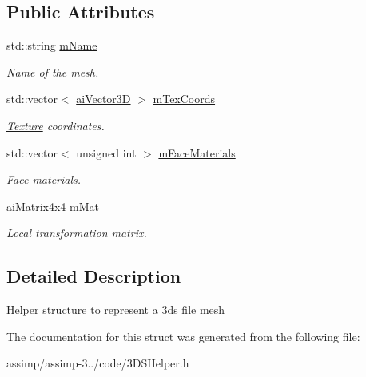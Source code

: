 \subsection*{Public Attributes}
\begin{DoxyCompactItemize}
\item 
\hypertarget{struct_assimp_1_1_d3_d_s_1_1_mesh_ae7afc8aec6109034179b696a19a62d49}{std\+::string \hyperlink{struct_assimp_1_1_d3_d_s_1_1_mesh_ae7afc8aec6109034179b696a19a62d49}{m\+Name}}\label{struct_assimp_1_1_d3_d_s_1_1_mesh_ae7afc8aec6109034179b696a19a62d49}

\begin{DoxyCompactList}\small\item\em Name of the mesh. \end{DoxyCompactList}\item 
\hypertarget{struct_assimp_1_1_d3_d_s_1_1_mesh_a41f938abc5be907009a83ef77651289e}{std\+::vector$<$ \hyperlink{structai_vector3_d}{ai\+Vector3\+D} $>$ \hyperlink{struct_assimp_1_1_d3_d_s_1_1_mesh_a41f938abc5be907009a83ef77651289e}{m\+Tex\+Coords}}\label{struct_assimp_1_1_d3_d_s_1_1_mesh_a41f938abc5be907009a83ef77651289e}

\begin{DoxyCompactList}\small\item\em \hyperlink{struct_assimp_1_1_d3_d_s_1_1_texture}{Texture} coordinates. \end{DoxyCompactList}\item 
\hypertarget{struct_assimp_1_1_d3_d_s_1_1_mesh_a99b188d70c456989949ffba3a95c9a1c}{std\+::vector$<$ unsigned int $>$ \hyperlink{struct_assimp_1_1_d3_d_s_1_1_mesh_a99b188d70c456989949ffba3a95c9a1c}{m\+Face\+Materials}}\label{struct_assimp_1_1_d3_d_s_1_1_mesh_a99b188d70c456989949ffba3a95c9a1c}

\begin{DoxyCompactList}\small\item\em \hyperlink{struct_assimp_1_1_d3_d_s_1_1_face}{Face} materials. \end{DoxyCompactList}\item 
\hypertarget{struct_assimp_1_1_d3_d_s_1_1_mesh_aa72f0d7add4eeadbdfbc03999b9bd21c}{\hyperlink{structai_matrix4x4}{ai\+Matrix4x4} \hyperlink{struct_assimp_1_1_d3_d_s_1_1_mesh_aa72f0d7add4eeadbdfbc03999b9bd21c}{m\+Mat}}\label{struct_assimp_1_1_d3_d_s_1_1_mesh_aa72f0d7add4eeadbdfbc03999b9bd21c}

\begin{DoxyCompactList}\small\item\em Local transformation matrix. \end{DoxyCompactList}\end{DoxyCompactItemize}


\subsection{Detailed Description}
Helper structure to represent a 3ds file mesh 

The documentation for this struct was generated from the following file\+:\begin{DoxyCompactItemize}
\item 
assimp/assimp-\/3../code/3\+D\+S\+Helper.\+h\end{DoxyCompactItemize}
